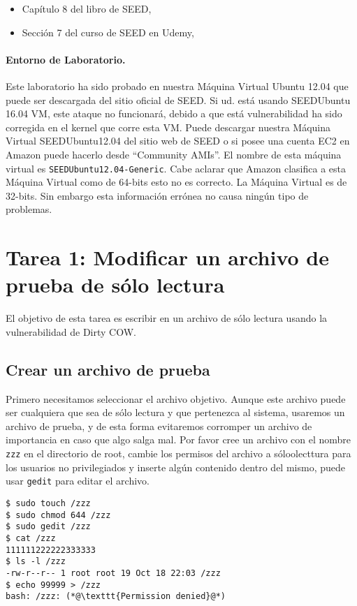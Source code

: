 \begin{itemize}
\item Capítulo 8 del libro de SEED, \seedbook
\item Sección 7 del curso de SEED en Udemy, \seedcsvideo
\end{itemize}


\paragraph{Entorno de Laboratorio.}  Este laboratorio ha sido probado en nuestra Máquina Virtual Ubuntu 12.04 que puede ser descargada del sitio oficial de SEED.
Si ud. está usando SEEDUbuntu 16.04 VM, este ataque no funcionará, debido a que está vulnerabilidad ha sido corregida en el kernel que corre esta VM. Puede descargar nuestra Máquina Virtual SEEDUbuntu12.04 del sitio web de SEED o si posee una cuenta EC2 en Amazon puede hacerlo desde ``Community AMIs''. El nombre de esta máquina virtual es \texttt{SEEDUbuntu12.04-Generic}. Cabe aclarar que Amazon clasifica a esta Máquina Virtual como de 64-bits esto no es correcto. La Máquina Virtual es de 32-bits. Sin embargo esta información errónea no causa ningún tipo de problemas.



\section{Tarea 1: Modificar un archivo de prueba de sólo lectura}

El objetivo de esta tarea es escribir en un archivo de sólo lectura usando la vulnerabilidad de Dirty COW.

\subsection{Crear un archivo de prueba}

Primero necesitamos seleccionar el archivo objetivo. Aunque este archivo puede ser cualquiera que sea de sólo lectura y que pertenezca al sistema, usaremos un archivo de prueba, y de esta forma evitaremos corromper un archivo de importancia en caso que algo salga mal. Por favor cree un archivo con el nombre  \texttt{zzz} en el directorio de root, cambie los permisos del archivo a sóloolecttura para los usuarios no privilegiados y inserte algún contenido dentro del mismo, puede usar  \texttt{gedit} para editar el archivo.
 

\begin{lstlisting}
$ sudo touch /zzz
$ sudo chmod 644 /zzz
$ sudo gedit /zzz
$ cat /zzz
111111222222333333
$ ls -l /zzz
-rw-r--r-- 1 root root 19 Oct 18 22:03 /zzz
$ echo 99999 > /zzz
bash: /zzz: (*@\texttt{Permission denied}@*)
\end{lstlisting}
 
